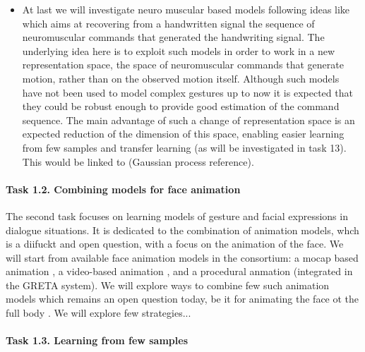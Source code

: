 \begin{itemize}
  \item At last we will investigate neuro muscular based models following ideas like \cite{DBLP:conf/icfhr/FischerPOS1} which aims at recovering from a handwritten signal the sequence of neuromuscular commands that generated the handwriting signal. The underlying idea here is to exploit such models in order to work in a new representation space, the space of neuromuscular commands that generate motion, rather than on the observed motion itself. 
  Although such models have not been used to model complex gestures up to now it is expected that they could be robust enough to provide good estimation of the command sequence. The main advantage of such a change of representation space is an expected reduction of the dimension of this space, enabling easier learning from few samples and transfer learning (as will be investigated in task 13). This would be linked to (Gaussian process reference).

\end{itemize}


\paragraph{Task 1.2. Combining models for face animation } 

The second task focuses on learning models of gesture and facial expressions in dialogue situations. It is dedicated to the combination of animation models, whch is a diifuckt and open question, with a focus on the animation of the face. We will start from available face animation models in the consortium: a mocap based animation \cite{Ding2013}, a video-based animation \cite{TheseINRIA}, and a procedural anmation \cite{RefGRETA} (integrated in the GRETA system). 
We will explore ways to combine few such animation models which remains an open question today, be it for animating the face ot the full body \cite{...}. We will explore few strategies...

% 
% 

\paragraph{Task 1.3. Learning from few samples}

